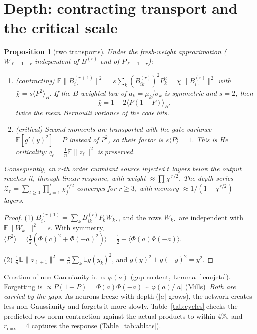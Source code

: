 \documentclass[11pt]{article}
\newtheorem{proposition}[theorem]{Proposition}
\theoremstyle{definition}
\theoremstyle{remark}
\newcommand{\E}{\mathbb E}
\begin{document}
\section{Depth: contracting transport and the critical scale}\label{sec:depth}

\begin{proposition}[two transports]\label{prop:depth}
Under the fresh-weight approximation ($W_{\ell-1-r}$ independent of $B^{(r)}$ and of $P_{\ell-1-r}$):
\begin{enumerate}
\item (contracting) $\E\|B^{(r+1)}_{i\cdot}\|^2=s\sum_k(B^{(r)}_{ik})^2P_k^2=\bar\chi\,\|B^{(r)}_{i\cdot}\|^2$ with $\bar\chi=s\langle P^2\rangle_B$. If the $B$-weighted law of $a_k=\mu_k/\sigma_k$ is symmetric and $s=2$, then
\[
\bar\chi=1-2\big\langle P(1-P)\big\rangle_B,
\]
twice the mean Bernoulli variance of the code bits.
\item (critical) Second moments are transported with the gate variance $\E[g'(y)^2]=P$ instead of $P^2$, so their factor is $s\langle P\rangle=1$. This is He criticality: $q_\ell=\frac1n\E\|z_\ell\|^2$ is preserved.
\end{enumerate}
Consequently, an $r$-th order cumulant source injected $t$ layers below the output reaches it, through linear response, with weight $\approx\prod\bar\chi^{\,r/2}$. The depth series $\mathcal Z_r=\sum_{t\ge0}\prod_{j=1}^{t}\bar\chi_{j}^{\,r/2}$ converges for $r\ge3$, with memory $\approx1/(1-\bar\chi^{r/2})$ layers.
\end{proposition}

\begin{proof}
(1) $B^{(r+1)}_{i\cdot}=\sum_kB^{(r)}_{ik}P_kW_{k\cdot}$, and the rows $W_{k\cdot}$ are independent with $\E\|W_{k\cdot}\|^2=s$. With symmetry, $\langle P^2\rangle=\langle\frac12(\Phi(a)^2+\Phi(-a)^2)\rangle=\frac12-\langle\Phi(a)\Phi(-a)\rangle$.

(2) $\frac1n\E\|z_{\ell+1}\|^2=\frac sn\sum_k\E g(y_k)^2$, and $g(y)^2+g(-y)^2=y^2$.
\end{proof}

\noindent Creation of non-Gaussianity is $\propto\varphi(a)$ (gap content, Lemma~\ref{lem:jets}). Forgetting is $\propto P(1-P)=\Phi(a)\Phi(-a)\sim\varphi(a)/|a|$ (Mills). \emph{Both are carried by the gaps}. As neurons freeze with depth ($|a|$ grows), the network creates less non-Gaussianity and forgets it more slowly. Table~\ref{tab:cycles} checks the predicted row-norm contraction against the actual products to within $4\%$, and $r_{\max}=4$ captures the response (Table~\ref{tab:ablate}).
\end{document}
